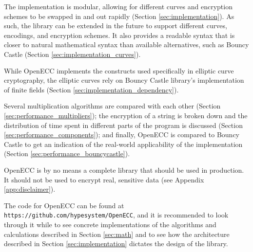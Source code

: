The implementation is modular, allowing for different curves and encryption schemes to be swapped in and out
rapidly (Section \ref{sec:implementation}). As such, the library can be extended in the future to support different
curves, encodings, and encryption schemes. It also provides a readable syntax that is closer to natural mathematical
syntax than available alternatives, such as Bouncy Castle (Section \ref{sec:implementation_curves}).

While OpenECC implements the constructs used specifically in elliptic curve cryptography, the elliptic curves rely on
Bouncy Castle library's implementation of finite fields (Section \ref{sec:implementation_dependency}).

Several multiplication algorithms are compared with each other (Section \ref{sec:performance_multipliers});
the encryption of a string is broken down and the distribution of time spent in different parts of the program
is discussed (Section \ref{sec:performance_components}); and finally, OpenECC is compared to Bouncy Castle to
get an indication of the real-world applicability of the implementation (Section \ref{sec:performance_bouncycastle}).

OpenECC is by no means a complete library that should be used in production. It should not be used to encrypt real,
sensitive data (see Appendix \ref{app:disclaimer}).

The code for OpenECC can be found at \texttt{https://github.com/hypesystem/OpenECC}, and it is recommended to look
through it while to see concrete implementations of the algorithms and calculations described in Section
\ref{sec:math} and to see how the architecture described in Section \ref{sec:implementation} dictates the design
of the library.